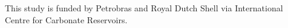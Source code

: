 \documentclass[draft,linenumbers]{agujournal2018}
\begin{document}
\acknowledgments
 This study is funded by Petrobras and Royal Dutch Shell via International Centre for Carbonate Reservoirs. 



%

%




\end{document}
